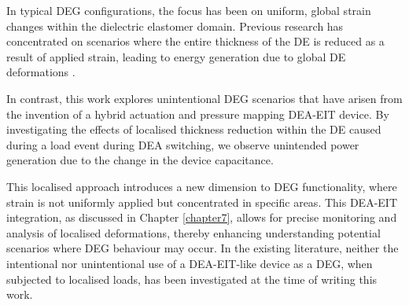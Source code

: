 In typical DEG configurations, the focus has been on uniform, global strain changes within the dielectric elastomer domain. Previous research has concentrated on scenarios where the entire thickness of the DE is reduced as a result of applied strain, leading to energy generation due to global DE deformations \cite{Carpi2015, Savage2012, Koh2009}.

In contrast, this work explores unintentional DEG scenarios that have arisen from the invention of a hybrid actuation and pressure mapping DEA-EIT device. By investigating the effects of localised thickness reduction within the DE caused during a load event during DEA switching, we observe unintended power generation due to the change in the device capacitance.

This localised approach introduces a new dimension to DEG functionality, where strain is not uniformly applied but concentrated in specific areas. This DEA-EIT integration, as discussed in Chapter \ref{chapter7}, allows for precise monitoring and analysis of localised deformations, thereby enhancing understanding potential scenarios where DEG behaviour may occur. In the existing literature, neither the intentional nor unintentional use of a DEA-EIT-like device as a DEG, when subjected to localised loads, has been investigated at the time of writing this work.



